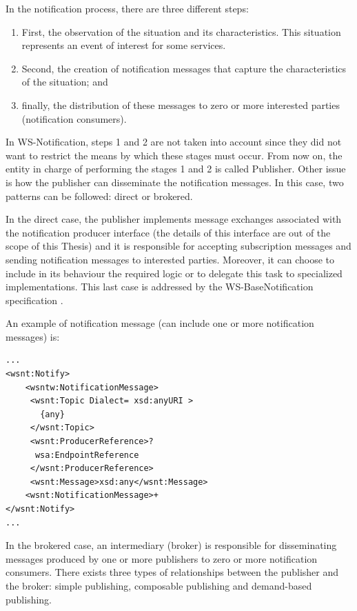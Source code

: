 In the notification process, there are three different steps: 
\begin{enumerate}
\item First, the observation of the situation and its characteristics. This situation represents an event of
interest for some services.
\item Second, the creation of notification messages that capture 
the characteristics of the situation; and
\item finally, the distribution of these messages to zero or more interested parties (notification consumers).
\end{enumerate}
In WS-Notification, steps 1 and 2 are not taken into account 
since they did not want to restrict the means by which
these stages must occur. From now on, the entity in charge of performing the stages 1 and 2 is called Publisher.
Other issue is how the publisher can disseminate the notification messages. 
In this case, two patterns can be followed: direct or brokered.

In the direct case, the publisher implements message exchanges associated with
the notification producer interface (the details of this interface are out of the scope of this Thesis)
and it is responsible for accepting subscription messages and
sending notification messages to interested parties. Moreover, it
can choose to include in its behaviour the required logic or to delegate this task to specialized implementations. 
This last case is addressed by the WS-BaseNotification
specification \cite{}.

An example of notification message (can include one or more notification messages) is:
 
\lstset{language=XML, numbersep=5pt, frame=single}
\begin{lstlisting}
...
<wsnt:Notify>
    <wsntw:NotificationMessage>
     <wsnt:Topic Dialect= xsd:anyURI >
       {any}
     </wsnt:Topic>
     <wsnt:ProducerReference>?
      wsa:EndpointReference
     </wsnt:ProducerReference>
     <wsnt:Message>xsd:any</wsnt:Message>
    <wsnt:NotificationMessage>+
</wsnt:Notify>
...
\end{lstlisting}

In the brokered case, an intermediary (broker) is responsible for disseminating
messages produced by one or more publishers to zero
or more notification consumers. There exists three types of relationships between the publisher and the
broker: simple publishing, composable publishing and demand-based publishing.

